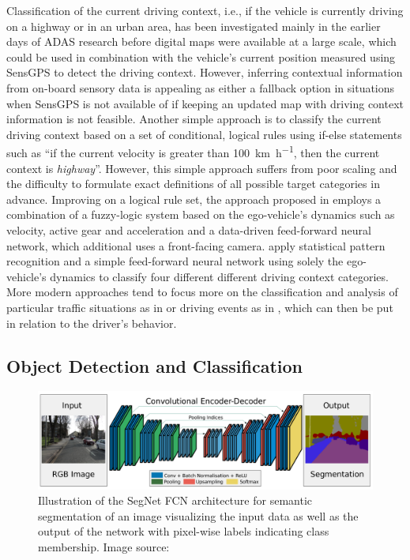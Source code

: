 Classification of the current driving context, i.e., if the vehicle is currently driving on a highway or in an urban area, has been investigated mainly in the earlier days of \ac{ADAS} research before digital maps were available at a large scale, which could be used in combination with the vehicle's current position measured using \ac{SensGPS} to detect the driving context.
However, inferring contextual information from on-board sensory data is appealing as either a fallback option in situations when \ac{SensGPS} is not available of if keeping an updated map with driving context information is not feasible.
Another simple approach is to classify the current driving context based on a set of conditional, logical rules using if-else statements such as \enquote{if the current velocity is greater than \SI{100}{\kilo\meter\per\hour}, then the current context is \emph{highway}}.
However, this simple approach suffers from poor scaling and the difficulty to formulate exact definitions of all possible target categories in advance.
Improving on a logical rule set, the approach proposed in \textcite{Hauptmann1996} employs a combination of a fuzzy-logic system based on the ego-vehicle's dynamics such as velocity, active gear and acceleration and a data-driven feed-forward neural network, which additional uses a front-facing camera.
\textcite{Engstrom2001} apply statistical pattern recognition and a simple feed-forward neural network using solely the ego-vehicle's dynamics to classify four different different driving context categories.
More modern approaches tend to focus more on the classification and analysis of particular traffic situations  as in \textcite{Hermann2008} or driving events as in \textcite{Dagostino2013}, which can then be put in relation to the driver's behavior.

\subsection{Object Detection and Classification}
\label{subsec:obj_detect}

\begin{figure}[t!]
    \centering
    \includegraphics[width=0.95\linewidth]{imgs/segnet.png}
    \caption{Illustration of the SegNet \ac{FCN} architecture for semantic segmentation of an image visualizing the input data as well as the output of the network with pixel-wise labels indicating class membership. Image source: \textcite{Badrinarayanan2015}}
    \label{fig:segnet_achitecture}
\end{figure}


